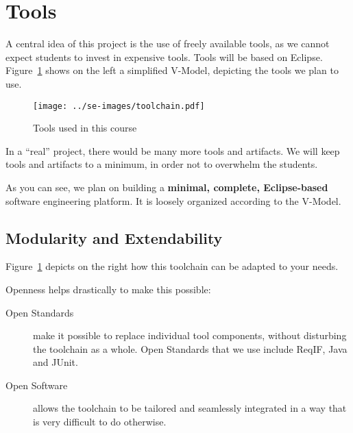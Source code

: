 \section{Tools}

A central idea of this project is the use of freely available tools, as we cannot expect students to invest in expensive tools.  Tools will be based on Eclipse.  Figure~\ref{fig:v-model} shows on the left a simplified V-Model, depicting the tools we plan to use.

\begin{figure}[h!]
  \centering
  \texttt{[image: ../se-images/toolchain.pdf]}
  \caption{Tools used in this course}
  \label{fig:v-model}
\end{figure}

\begin{info}
In a ``real'' project, there would be many more tools and artifacts.  We will keep tools and artifacts to a minimum, in order not to overwhelm the students.
\end{info}

As you can see, we plan on building a \textbf{minimal, complete, Eclipse-based} software engineering platform.  It is loosely organized according to the V-Model.

\subsection{Modularity and Extendability}

Figure~\ref{fig:v-model} depicts on the right how this toolchain can be adapted to your needs.


Openness helps drastically to make this possible:

\begin{description}
\item[Open Standards] make it possible to replace individual tool components, without disturbing the toolchain as a whole.  Open Standards that we use include ReqIF, Java and JUnit.
\item[Open Software] allows the toolchain to be tailored and seamlessly integrated in a way that is very difficult to do otherwise.
\end{description}

